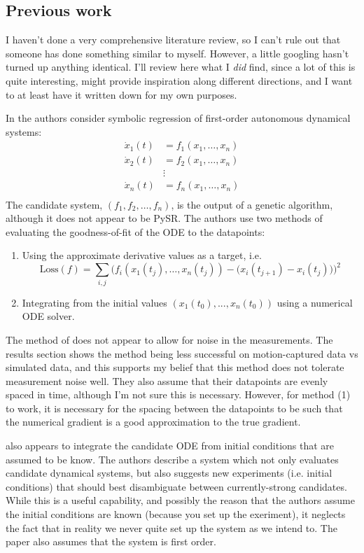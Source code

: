 \documentclass{article}
\begin{document}
\subsection{Previous work}

I haven't done a very comprehensive literature review, so I can't rule out that someone has done something similar to myself.
However, a little googling hasn't turned up anything identical.
I'll review here what I \emph{did} find, since a lot of this is quite interesting, might provide inspiration along different directions, and I want to at least have it written down for my own purposes.

In \cite{kronberger2019identification} the authors consider symbolic regression of first-order autonomous dynamical systems:
\begin{align}
\dot{x}_1(t) &= f_1\left(x_1, \dots, x_n\right) \nonumber \\
\dot{x}_2(t) &= f_2\left(x_1, \dots, x_n\right) \nonumber \\
 & \vdots \nonumber \\
\dot{x}_n(t) &= f_n\left(x_1, \dots, x_n\right) \nonumber \\
\end{align}
The candidate system, $\left( f_1, f_2, \dots, f_n\right)$, is the output of a genetic algorithm, although it does not appear to be PySR.
The authors use two methods of evaluating the goodness-of-fit of the ODE to the datapoints:
\begin{enumerate}
\item Using the approximate derivative values as a target, i.e.
$$
\mathrm{Loss}(f) = \sum_{i, j} \bigg(f_i\left( x_1(t_j), \dots, x_n(t_j) \right) - \big(x_i(t_{j+1}) - x_i(t_j)\big) \bigg)^2
$$
\item Integrating from the initial values $(x_1(t_0), ..., x_n(t_0))$ using a numerical ODE solver.
\end{enumerate}
The method of \cite{kronberger2019identification} does not appear to allow for noise in the measurements.
The results section shows the method being less successful on motion-captured data vs simulated data, and this supports my belief that this method does not tolerate measurement noise well.
They also assume that their datapoints are evenly spaced in time, although I'm not sure this is necessary. However, for method (1) to work, it is necessary for the spacing between the datapoints to be such that the numerical gradient is a good approximation to the true gradient.

\cite{bongard2007automated} also appears to integrate the candidate ODE from initial conditions that are assumed to be know.
The authors describe a system which not only evaluates candidate dynamical systems, but also suggests new experiments (i.e. initial conditions) that should best disambiguate between currently-strong candidates.
While this is a useful capability, and possibly the reason that the authors assume the initial conditions are known (because you set up the exeriment), it neglects the fact that in reality we never quite set up the system as we intend to.
The paper also assumes that the system is first order.
\end{document}
